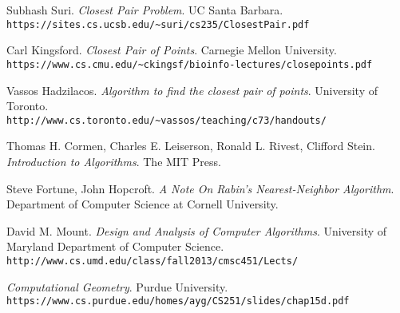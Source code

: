 \documentclass[12pt]{report}
\begin{document}
\begin{thebibliography}{9}

Subhash Suri.
\textit{Closest Pair Problem}. 
UC Santa Barbara.
\\\texttt{https://sites.cs.ucsb.edu/\textasciitilde suri/cs235/ClosestPair.pdf}
  
Carl Kingsford.
\textit{Closest Pair of Points}. 
Carnegie Mellon University.
\\\texttt{https://www.cs.cmu.edu/\textasciitilde ckingsf/bioinfo-lectures/closepoints.pdf}

Vassos Hadzilacos.
\textit{Algorithm to find the closest pair of points}. 
University of Toronto.
\\\texttt{http://www.cs.toronto.edu/\textasciitilde vassos/teaching/c73/handouts/}

Thomas H. Cormen, Charles E. Leiserson, Ronald L. Rivest, Clifford Stein.
\textit{Introduction to Algorithms}. 
The MIT Press.

Steve Fortune, John Hopcroft.
\textit{ A Note On Rabin’s Nearest-Neighbor Algorithm}. 
Department of Computer Science at Cornell University.

David M. Mount.
\textit{Design and Analysis of Computer Algorithms}. 
University of Maryland Department of Computer Science.
\\\texttt{http://www.cs.umd.edu/class/fall2013/cmsc451/Lects/}

\textit{Computational Geometry}. 
Purdue University.
\\\texttt{https://www.cs.purdue.edu/homes/ayg/CS251/slides/chap15d.pdf}

\end{thebibliography}
\end{document}
